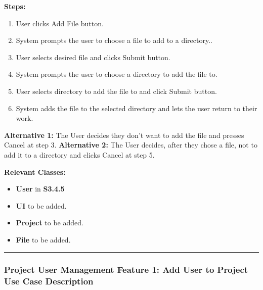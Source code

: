 \documentclass[twoside,letterpaper]{article}
\begin{document}
	\noindent\textbf{Steps:} \begin{enumerate}
		\item User clicks Add File button.
		\item System prompts the user to choose a file to add to a directory..
		\item User selects desired file and clicks Submit button.
		\item System prompts the user to choose a directory to add the file to.
		\item User selects directory to add the file to and click Submit button.
		\item System adds the file to the selected directory and lets the user return to their work.
	
	\end{enumerate}
	\noindent\textbf{Alternative 1:} The User decides they don't want to add the file and presses Cancel at step 3. \newline
	\noindent\textbf{Alternative 2:} The User decides, after they chose a file, not to add it to a directory and clicks Cancel at step 5. \newline
	
	\noindent\textbf{Relevant Classes:}
	\begin{itemize}
		\item \textbf{User} in \textbf{S3.4.5}
		\item \textbf{UI} to be added.
		\item \textbf{Project} to be added.
		\item \textbf{File} to be added.
	\end{itemize}
	\vspace{8pt}
	\hrule
	\bigskip
	
	\newpage
	
	\subsubsection[Project User Management Feature 1: Add User to Project Use Case Description]{\rmfamily\bfseries\color{black}
		Project User Management Feature 1: Add User to Project Use Case Description}
	\hypertarget{RefHeading22059017292}{}
	
\end{document}
